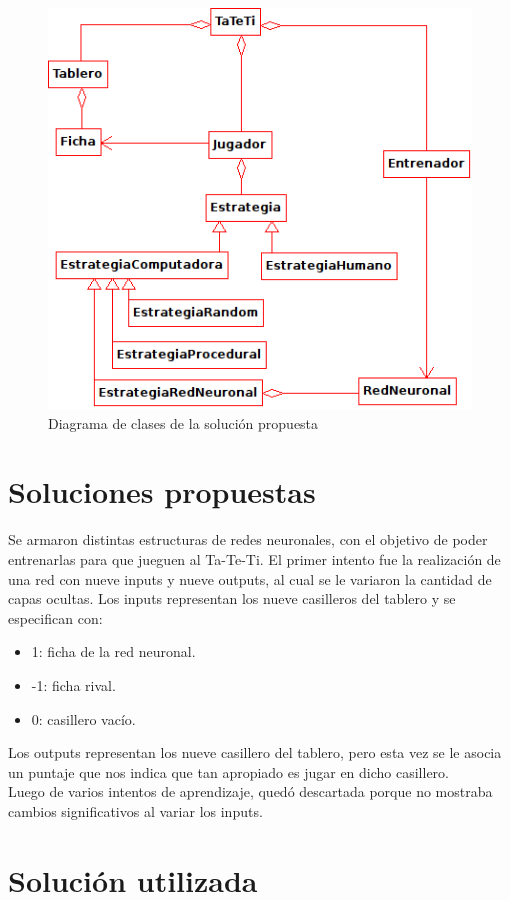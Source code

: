 \documentclass[12pt,titlepage]{article}
\begin{document}
\begin{figure}[h!]
 \centering
 \includegraphics{./imgs/diagrama-de-clase.png}
 \caption{Diagrama de clases de la soluci\'on propuesta}
\end{figure}

\section{Soluciones propuestas}
Se armaron distintas estructuras de redes neuronales, con el objetivo de poder entrenarlas para que jueguen al Ta-Te-Ti. El primer intento fue la realizaci\'on de una red con nueve inputs y nueve outputs, al cual se le variaron la cantidad de capas ocultas. Los inputs representan los nueve casilleros del tablero y se especifican con:
\begin{itemize}
 \item 1: ficha de la red neuronal.
 \item -1: ficha rival.
 \item 0: casillero vac\'io.
\end{itemize}
Los outputs representan los nueve casillero del tablero, pero esta vez se le asocia un puntaje que nos indica que tan apropiado es jugar en dicho casillero. \\
Luego de varios intentos de aprendizaje, qued\'o descartada porque no mostraba cambios significativos al variar los inputs. 

\section{Soluci\'on utilizada}
\end{document}
